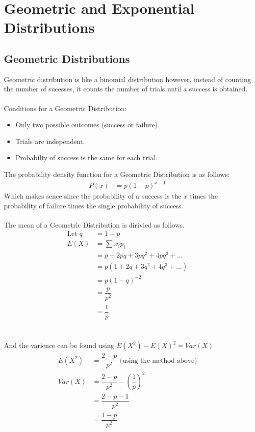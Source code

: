 
\section{Geometric and Exponential Distributions}
    
    \subsection{Geometric Distributions}
        Geometric distribution is like a binomial distribution however, instead of counting the number of sucesses, it counts the number of trials until a success is obtained.
        \\\\
        Conditions for a Geometric Distribution:
        \begin{itemize}
        \item Only two possible outcomes (success or failure).
        \item Trials are independent.
        \item Probabilty of success is the same for each trial.
        \end{itemize}
        The probability density function for a Geometric Distribution is as follows:
        \begin{align*}
        P(x) &= p(1-p)^{x-1}
        \end{align*}
        Which makes sence since the probability of a success is the $x$ times the probability of failure times the single probability of success.
        \\\\
        The mean of a Geometric Distribution is dirivied as follows.
        \begin{align*}
        \text{Let }q &= 1-p                     \\
        E(X) &= \sum{x_i p_i}                   \\
             &= p + 2pq + 3pq^2 + 4pq^3 + ...   \\
             &= p(1 + 2q + 3q^2 + 4q^3 + ...)   \\
             &= p(1-q)^{-2}                     \\
             &= \dfrac{p}{p^2}                  \\
             &= \dfrac{1}{p}
        \end{align*}
        \\\\
        And the varience can be found using $E(X^2) - E(X)^2 = Var(X)$
        \begin{align*}
        E(X^2) &= \dfrac{2-p}{p^2} \text{  (using the method above)}    \\
        Var(X) &= \dfrac{2-p}{p^2} - \left(\dfrac{1}{p}\right)^2        \\
               &= \dfrac{2-p-1}{p^2}                                    \\
               &= \dfrac{1-p}{p^2}                                      \\
        \end{align*}
